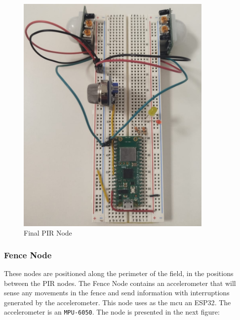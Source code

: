 \begin{figure}[H]
    \centering
    \includegraphics[width=0.85\textwidth,angle=-90]{./images/8/PIRNode.jpg}
    \caption{Final PIR Node}
    \label{fig:PIRFisico}
\end{figure}

\clearpage
\subsubsection*{Fence Node}

These nodes are positioned along the perimeter of the field, in the positions between the PIR nodes. The Fence Node contains an accelerometer that will sense 
any movements in the fence and send information with interruptions generated by the accelerometer. This node uses as the \acrshort{mcu} an ESP32\cite{esp32wroom32_datasheet_en}. The accelerometer is an \texttt{MPU-6050}\cite{MPU6000Datasheet1}. The node is presented in the next figure:

